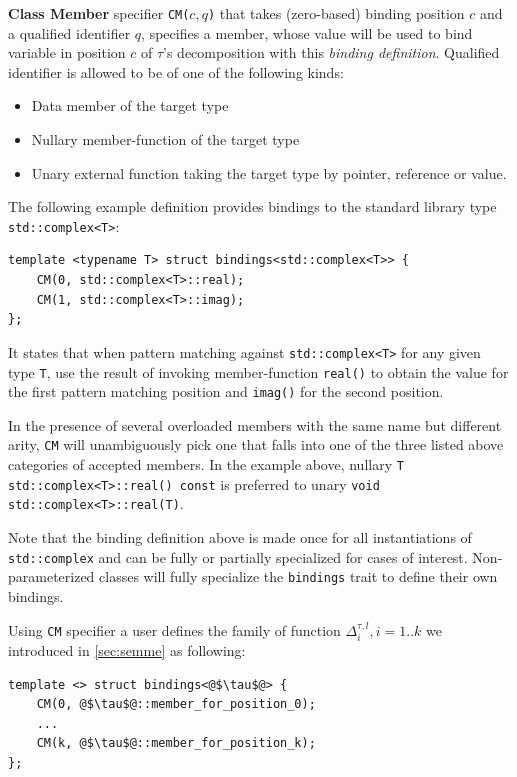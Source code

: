 \documentclass[preprint]{sigplanconf}
\makeatletter
\DeclareRobustCommand{\code}[1]{{\lstinline[breaklines=false,escapechar=@]{#1}}}
\makeatother
\begin{document}
{\bf Class Member} specifier \code{CM(}$c,q$\code{)} that takes (zero-based) binding 
position $c$ and a qualified identifier $q$, specifies a member, whose value will 
be used to bind variable in position $c$ of $\tau$'s decomposition with this 
\emph{binding definition}. Qualified identifier is allowed to be of one of the 
following kinds:

\begin{itemize}
\item Data member of the target type
\item Nullary member-function of the target type
\item Unary external function taking the target type by pointer, reference or value.
\end{itemize}

\noindent
The following example definition provides bindings to the standard library type 
\code{std::complex<T>}:

\begin{lstlisting}[keepspaces,columns=flexible]
template <typename T> struct bindings<std::complex<T>> {
    CM(0, std::complex<T>::real); 
    CM(1, std::complex<T>::imag); 
};
\end{lstlisting}

\noindent
It states that when pattern matching against \code{std::complex<T>} for any 
given type \code{T}, use the result of invoking member-function \code{real()} to 
obtain the value for the first pattern matching position and \code{imag()} for 
the second position. 

In the presence of several overloaded members with the same name but different 
arity, \code{CM} will unambiguously pick one that falls into one of the three 
listed above categories of accepted members. In the example above, nullary 
\code{T std::complex<T>::real() const} is preferred to unary 
\code{void std::complex<T>::real(T)}.

Note that the binding definition above is made once for all instantiations of 
\code{std::complex} and can be fully or partially specialized for cases of 
interest. Non-parameterized classes will fully specialize the \code{bindings} 
trait to define their own bindings.

Using \code{CM} specifier a user defines the family of function 
$\Delta_i^{\tau,l},i=1..k$ we introduced in \textsection\ref{sec:semme} as 
following:

\begin{lstlisting}
template <> struct bindings<@$\tau$@> {
    CM(0, @$\tau$@::member_for_position_0); 
    ...
    CM(k, @$\tau$@::member_for_position_k); 
};
\end{lstlisting}
\end{document}

